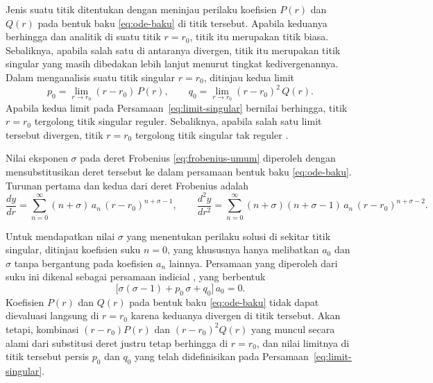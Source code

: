 Jenis suatu titik ditentukan dengan meninjau perilaku koefisien $P(r)$ dan $Q(r)$ pada
bentuk baku \eqref{eq:ode-baku} di titik tersebut. Apabila keduanya berhingga dan analitik
di suatu titik $r = r_0$, titik itu merupakan titik biasa. Sebaliknya, apabila salah satu di
antaranya divergen, titik itu merupakan titik singular yang masih dibedakan lebih lanjut
menurut tingkat kedivergenannya. Dalam menganalisis suatu titik singular $r = r_0$, ditinjau kedua limit
\begin{equation}
    p_0 = \lim_{r \to r_0} (r - r_0)\,P(r), \qquad
    q_0 = \lim_{r \to r_0} (r - r_0)^2\, Q(r).
    \label{eq:limit-singular}
\end{equation}
Apabila kedua limit pada Persamaan~\eqref{eq:limit-singular} bernilai berhingga, titik
$r = r_0$ tergolong titik singular reguler. Sebaliknya, apabila salah satu limit tersebut
divergen, titik $r = r_0$ tergolong titik singular tak reguler \parencite{Riley2006, boas2006}.

Nilai eksponen $\sigma$ pada deret Frobenius \eqref{eq:frobenius-umum} diperoleh dengan
mensubstitusikan deret tersebut ke dalam persamaan bentuk baku \eqref{eq:ode-baku}. Turunan
pertama dan kedua dari deret Frobenius adalah
\begin{equation}
    \frac{dy}{dr} = \sum_{n=0}^{\infty}(n+\sigma)\,a_n\,(r-r_0)^{n+\sigma-1}, \qquad
    \frac{d^2y}{dr^2} = \sum_{n=0}^{\infty}(n+\sigma)(n+\sigma-1)\,a_n\,(r-r_0)^{n+\sigma-2}.
    \label{eq:turunan-frobenius}
\end{equation}

Untuk mendapatkan nilai $\sigma$ yang menentukan perilaku solusi di sekitar titik singular,
ditinjau koefisien suku $n = 0$, yang khususnya hanya melibatkan $a_0$ dan $\sigma$ tanpa
bergantung pada koefisien $a_n$ lainnya. Persamaan yang diperoleh dari suku ini dikenal
sebagai persamaan indicial \parencite{Riley2006, boas2006}, yang berbentuk
\begin{equation}
    \Big[\sigma(\sigma-1) + p_0\,\sigma + q_0\Big]\,a_0 = 0.
    \label{eq:indicial-a0}
\end{equation}
Koefisien $P(r)$ dan $Q(r)$ pada bentuk baku \eqref{eq:ode-baku} tidak dapat dievaluasi
langsung di $r = r_0$ karena keduanya divergen di titik tersebut. Akan tetapi, kombinasi
$(r-r_0)P(r)$ dan $(r-r_0)^2 Q(r)$ yang muncul secara alami dari substitusi deret justru
tetap berhingga di $r = r_0$, dan nilai limitnya di titik tersebut persis $p_0$ dan $q_0$
yang telah didefinisikan pada Persamaan~\eqref{eq:limit-singular}.

